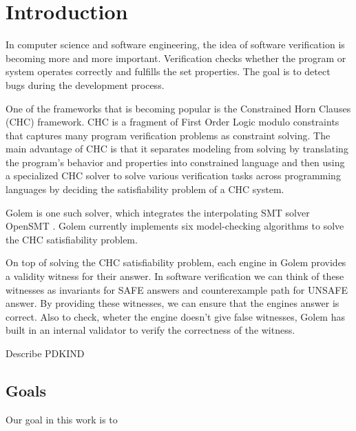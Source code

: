 \chapter{Introduction}

\noindent In computer science and software engineering, the idea of software verification is becoming more and more important. Verification checks whether the program or system operates correctly and fulfills the set properties. The goal is to detect bugs during the development process.

One of the frameworks that is becoming popular is the Constrained Horn Clauses (CHC) framework. CHC is a fragment of First Order Logic modulo constraints that captures many program verification problems as constraint solving. The main advantage of CHC is that it separates modeling from solving by translating the program's behavior and properties into constrained language and then using a specialized CHC solver to solve various verification tasks across programming languages by deciding the satisfiability problem of a CHC system.

Golem \cite{blicha_golem_2023} is one such solver, which integrates the interpolating SMT solver OpenSMT \cite{10.1007/978-3-319-40970-2_35}. Golem currently implements six model-checking algorithms to solve the CHC satisfiability problem.

On top of solving the CHC satisfiability problem, each engine in Golem provides a validity witness for their answer. In software verification we can think of these witnesses as invariants for SAFE answers and counterexample path for UNSAFE answer. By providing these witnesses, we can ensure that the engines answer is correct. Also to check, wheter the engine doesn't give false witnesses, Golem has built in an internal validator to verify the correctness of the witness. 

Describe PDKIND

\section{Goals}
\noindent Our goal in this work is to 
